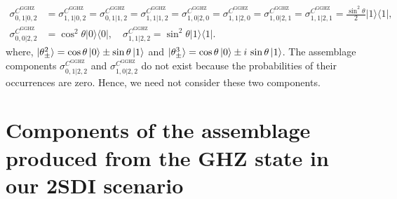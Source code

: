 \documentclass[reprint,superscriptaddress,nofootinbib,amsmath,amssymb,aps,pra,longbibliography]{revtex4-1}
\begin{document}
\begin{widetext}
\begin{align}
    \sigma_{0,1|0,2}^{C^{\text{GGHZ}}} &= \sigma_{1,1|0,2}^{C^{\text{GGHZ}}} = \sigma_{0,1|1,2}^{C^{\text{GGHZ}}} = \sigma_{1,1|1,2}^{C^{\text{GGHZ}}} = \sigma_{1,0|2,0}^{C^{\text{GGHZ}}} = \sigma_{1,1|2,0}^{C^{\text{GGHZ}}} = \sigma_{1,0|2,1}^{C^{\text{GGHZ}}} = \sigma_{1,1|2,1}^{C^{\text{GGHZ}}} =  \frac{\sin^2 \theta}{2} | 1 \rangle \langle 1 |, \nonumber \\
	\sigma_{0,0|2,2}^{C^{\text{GGHZ}}} &= \cos^2 \theta | 0 \rangle \langle 0 |,\quad  \sigma_{1,1|2,2}^{C^{\text{GGHZ}}} = \sin^2 \theta | 1 \rangle \langle 1 |.
	\label{GGHZ2Sassemblage}
\end{align}
where, $\ket{\theta_{\pm}^2} = \cos \theta \ket{0} \pm \sin \theta \ket{1}$ and $\ket{\theta_{\pm}^3} = \cos \theta \ket{0} \pm i \, \sin \theta  \ket{1}$. The assemblage components $\sigma_{0,1|2,2}^{C^{\text{GGHZ}}}$ and  $\sigma_{1,0|2,2}^{C^{\text{GGHZ}}}$ do not exist because the probabilities of their occurrences are  zero. Hence, we need not consider these two components.

\section{Components of the assemblage produced from the GHZ state in our 2SDI scenario}\label{2SAGHZ}


\end{widetext}
\end{document}
